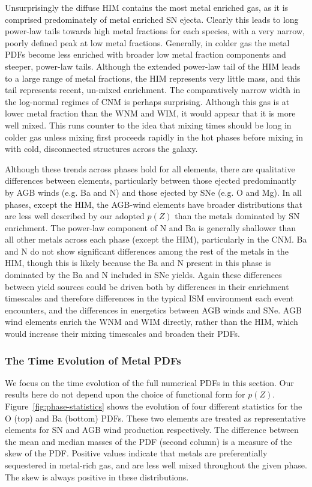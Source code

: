 \documentclass[twocolumn]{aastex61}
\begin{document}
Unsurprisingly the diffuse HIM contains the most metal enriched gas, as it is comprised predominately of metal enriched SN ejecta. Clearly this leads to long power-law tails towards high metal fractions for each species, with a very narrow, poorly defined peak at low metal fractions. Generally, in colder gas the metal PDFs become less enriched with broader low metal fraction components and steeper, power-law tails. Although the extended power-law tail of the HIM leads to a large range of metal fractions, the HIM represents very little mass, and this tail represents recent, un-mixed enrichment. The comparatively narrow width in the log-normal regimes of CNM is perhaps surprising. Although this gas is at lower metal fraction than the WNM and WIM, it would appear that it is more well mixed. This runs counter to the idea that mixing times should be long in colder gas unless mixing first proceeds rapidly in the hot phases before mixing in with cold, disconnected structures across the galaxy.

Although these trends across phases hold for all elements, there are qualitative differences between elements, particularly between those ejected predominantly by AGB winds (e.g. Ba and N) and those ejected by SNe (e.g. O and Mg). In all phases, except the HIM, the AGB-wind elements have broader distributions that are less well described by our adopted $p(Z)$ than the metals dominated by SN enrichment. The power-law component of N and Ba is generally shallower than all other metals across each phase (except the HIM), particularly in the CNM. Ba and N do not show significant differences among the rest of the metals in the HIM, though this is likely because the Ba and N present in this phase is dominated by the Ba and N included in SNe yields. Again these differences between yield sources could be driven both by differences in their enrichment timescales and therefore differences in the typical ISM environment each event encounters, and the differences in energetics between AGB winds and SNe. AGB wind elements enrich the WNM and WIM directly, rather than the HIM, which would increase their mixing timescales and broaden their PDFs.

\subsubsection{The Time Evolution of Metal PDFs}
\label{sec:statistics}
We focus on the time evolution of the full numerical PDFs in this section. Our results here do not depend upon the choice of functional form for $p(Z)$. Figure~\ref{fig:phase-statistics} shows the evolution of four different statistics for the O (top) and Ba (bottom) PDFs. These two elements are treated as representative elements for SN and AGB wind production respectively. The difference between the mean and median masses of the PDF (second column) is a measure of the skew of the PDF. Positive values indicate that metals are preferentially sequestered in metal-rich gas, and are less well mixed throughout the given phase. The skew is always positive in these distributions.
\end{document}
